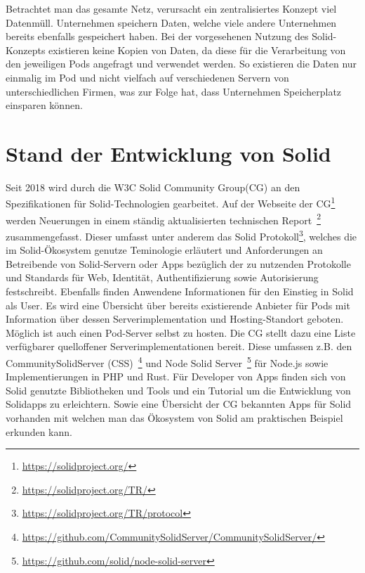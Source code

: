 \documentclass[acmtog]{acmart}
\begin{document}
Betrachtet man das gesamte Netz, verursacht ein zentralisiertes Konzept viel Datenmüll. Unternehmen speichern Daten, welche viele andere Unternehmen bereits ebenfalls gespeichert haben. Bei der vorgesehenen Nutzung des Solid-Konzepts existieren keine Kopien von Daten, da diese für die Verarbeitung von den jeweiligen Pods angefragt und verwendet werden. So existieren die Daten nur einmalig im Pod und nicht vielfach auf verschiedenen Servern von unterschiedlichen Firmen, was zur Folge hat, dass Unternehmen Speicherplatz einsparen können.


\section{Stand der Entwicklung von Solid} \label{section:standDerEntwicklung}
Seit 2018 wird durch die W3C Solid Community Group(CG) an den Spezifikationen für Solid-Technologien gearbeitet. 
Auf der Webseite der CG\footnote{\url{https://solidproject.org/}} werden Neuerungen in einem ständig aktualisierten technischen Report~\footnote{\url{https://solidproject.org/TR/}} zusammengefasst. Dieser umfasst unter anderem das Solid Protokoll\footnote{\url{https://solidproject.org/TR/protocol}}, welches die im Solid-Ökosystem genutze Teminologie erläutert und Anforderungen an Betreibende von Solid-Servern oder Apps bezüglich der zu nutzenden Protokolle und Standards für Web, Identität, Authentifizierung sowie Autorisierung festschreibt.
Ebenfalls finden Anwendene Informationen für den Einstieg in Solid als User. Es wird eine Übersicht über bereits existierende Anbieter für Pods mit Information über dessen Serverimplementation und Hosting-Standort geboten. Möglich ist auch einen Pod-Server selbst zu hosten. Die CG stellt dazu eine Liste verfügbarer quelloffener Serverimplementationen bereit. Diese umfassen z.B. den CommunitySolidServer (CSS)~\footnote{\url{https://github.com/CommunitySolidServer/CommunitySolidServer/}} und Node Solid Server~\footnote{\url{https://github.com/solid/node-solid-server}} für Node.js sowie Implementierungen in PHP und Rust.
Für Developer von Apps finden sich von Solid genutzte Bibliotheken und Tools und ein Tutorial um die Entwicklung von Solidapps zu erleichtern.
Sowie eine Übersicht der CG bekannten Apps für Solid vorhanden mit welchen man das Ökosystem von Solid am praktischen Beispiel erkunden kann.
\end{document}
